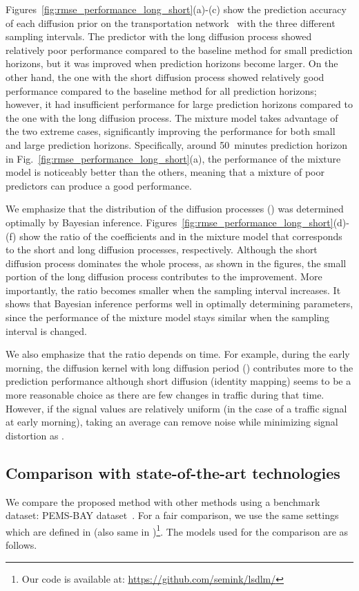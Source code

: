 \documentclass[journal]{IEEEtran}
\begin{document}
Figures~\ref{fig:rmse_performance_long_short}(a)-(c) show the prediction accuracy of each diffusion prior on the transportation network~ with the three different sampling intervals.
The predictor with the long diffusion process showed relatively poor performance compared to the baseline method for small prediction horizons, but it was improved when prediction horizons become larger. On the other hand, the one with the short diffusion process showed relatively good performance compared to the baseline method for all prediction horizons; however, it had insufficient performance for large prediction horizons compared to the one with the long diffusion process. The mixture model takes advantage of the two extreme cases, significantly improving the performance for both small and large prediction horizons. Specifically, around 50~minutes prediction horizon in Fig.~\ref{fig:rmse_performance_long_short}(a), the performance of the mixture model is noticeably better than the others, meaning that a mixture of poor predictors can produce a good performance.

We emphasize that the distribution of the diffusion processes () was determined optimally by Bayesian inference. Figures~\ref{fig:rmse_performance_long_short}(d)-(f) show the ratio of the coefficients  and  in the mixture model that corresponds to the short and long diffusion processes, respectively. Although the short diffusion process dominates the whole process, as shown in the figures, the small portion of the long diffusion process contributes to the improvement. 
More importantly, the ratio becomes smaller when the sampling interval increases. It shows that Bayesian inference performs well in optimally determining parameters, since the performance of the mixture model stays similar when the sampling interval is changed.



We also emphasize that the ratio depends on time. 
For example, during the early morning, the diffusion kernel with long diffusion period () contributes more to the prediction performance
although short diffusion (identity mapping) seems to be a more reasonable choice as there are few changes in traffic during that time. 
However, if the signal values are relatively uniform (in the case of a traffic signal at early morning), taking an average can remove noise while minimizing signal distortion as
.

 




\subsection{Comparison with state-of-the-art technologies}
We compare the proposed method with other methods using a benchmark dataset: PEMS-BAY dataset~\cite{li2018diffusion}.
For a fair comparison, we use the same settings which are defined in \cite{li2018diffusion} (also same in \cite{xu2018graph})\footnote{Our code is available at: \url{https://github.com/semink/lsdlm/}}.
The models used for the comparison are as follows.
\end{document}
